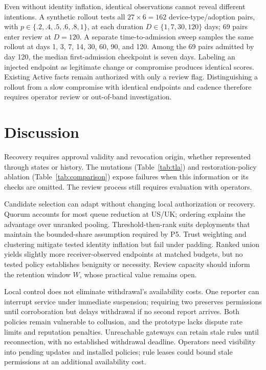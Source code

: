 \documentclass[journal]{IEEEtran}
\theoremstyle{definition}
\begin{document}
Even without identity inflation, identical observations cannot reveal different intentions. A synthetic rollout tests all $27\times6=162$ device-type/adoption pairs, with $p\in\{.2,.4,.5,.6,.8,1\}$, at each duration $D\in\{1,7,30,120\}$ days; 69 pairs enter review at $D=120$. A separate time-to-admission sweep samples the same rollout at days 1, 3, 7, 14, 30, 60, 90, and 120. Among the 69 pairs admitted by day 120, the median first-admission checkpoint is seven days. Labeling an injected endpoint as legitimate change or compromise produces identical scores. Existing Active facts remain authorized with only a review flag. Distinguishing a rollout from a slow compromise with identical endpoints and cadence therefore requires operator review or out-of-band investigation.

\section{Discussion}
\label{sec:discussion}

Recovery requires approval validity and revocation origin, whether represented through states or history. The mutations (Table~\ref{tab:tla}) and restoration-policy ablation (Table~\ref{tab:comparison}) expose failures when this information or its checks are omitted. The review process still requires evaluation with operators.

Candidate selection can adapt without changing local authorization or recovery. Quorum accounts for most queue reduction at US/UK; ordering explains the advantage over unranked pooling. Threshold-then-rank suits deployments that maintain the bounded-share assumption required by P5. Trust weighting and clustering mitigate tested identity inflation but fail under padding. Ranked union yields slightly more receiver-observed endpoints at matched budgets, but no tested policy establishes benignity or necessity. Review capacity should inform the retention window $W$, whose practical value remains open.

Local control does not eliminate withdrawal's availability costs. One reporter can interrupt service under immediate suspension; requiring two preserves permissions until corroboration but delays withdrawal if no second report arrives. Both policies remain vulnerable to collusion, and the prototype lacks dispute rate limits and reputation penalties. Unreachable gateways can retain stale rules until reconnection, with no established withdrawal deadline. Operators need visibility into pending updates and installed policies; rule leases could bound stale permissions at an additional availability cost.
\end{document}
